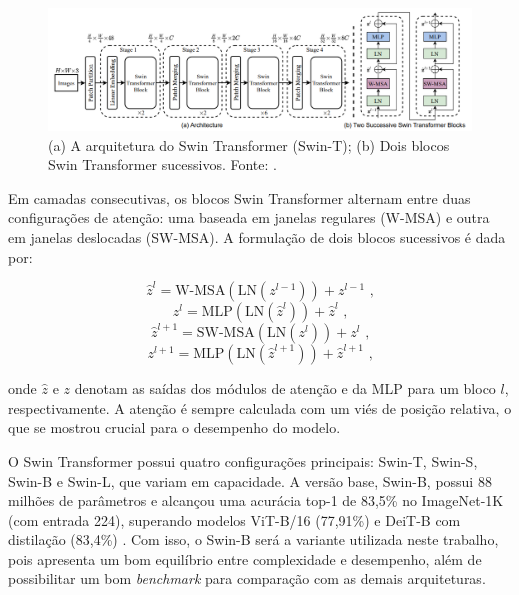 \begin{figure}[h]
    \centering
    \includegraphics[width=\linewidth]{figs/swin_t-arch.png}
    \caption{(a) A arquitetura do Swin Transformer (Swin-T); (b) Dois blocos Swin Transformer sucessivos. Fonte: \cite{Liu2021}.}
    \label{fig:swin-t-arch}
\end{figure}

Em camadas consecutivas, os blocos Swin Transformer alternam entre duas configurações de atenção: uma baseada em janelas regulares (W-MSA) e outra em janelas deslocadas (SW-MSA). A formulação de dois blocos sucessivos é dada por:

\begin{equation}
    \hat{z}^{l} = \text{W-MSA}(\text{LN}(z^{l-1}))+z^{l-1} \text{ ,}
\end{equation}
\begin{equation}
    z^{l} = \text{MLP}(\text{LN}(\hat{z}^{l}))+\hat{z}^{l} \text{ ,}
\end{equation}
\begin{equation}
    \hat{z}^{l+1} = \text{SW-MSA}(\text{LN}(z^{l}))+z^{l} \text{ ,}
\end{equation}
\begin{equation}
    z^{l+1} = \text{MLP}(\text{LN}(\hat{z}^{l+1}))+\hat{z}^{l+1} \text{ ,}
\end{equation}

onde $\hat{z}$ e $z$ denotam as saídas dos módulos de atenção e da MLP para um bloco $l$, respectivamente. A atenção é sempre calculada com um viés de posição relativa, o que se mostrou crucial para o desempenho do modelo.

O Swin Transformer possui quatro configurações principais: Swin-T, Swin-S, Swin-B e Swin-L, que variam em capacidade. A versão base, Swin-B, possui 88 milhões de parâmetros e alcançou uma acurácia top-1 de 83,5\% no ImageNet-1K (com entrada 224), superando modelos ViT-B/16 (77,91\%) e DeiT-B com distilação (83,4\%) \citep{Dosovitskiy2021, Touvron2021}. Com isso, o Swin-B será a variante utilizada neste trabalho, pois apresenta um bom equilíbrio entre complexidade e desempenho, além de possibilitar um bom \textit{benchmark} para comparação com as demais arquiteturas.

